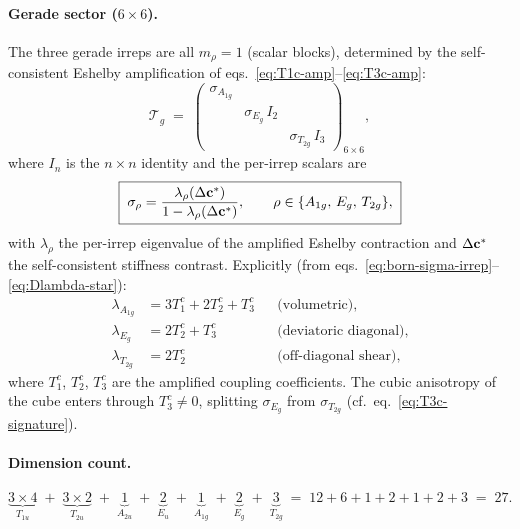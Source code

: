 \paragraph{Gerade sector ($6 \times 6$).}
The three gerade irreps are all $m_\rho = 1$ (scalar blocks),
determined by the self-consistent Eshelby amplification of
eqs.~\eqref{eq:T1c-amp}--\eqref{eq:T3c-amp}:
\begin{equation}
  \mathcal{T}_g
  \;=\;
  \begin{pmatrix}
    \sigma_{A_{1g}} & & \\[2pt]
    & \sigma_{E_g}\,I_2 & \\[2pt]
    & & \sigma_{T_{2g}}\,I_3
  \end{pmatrix}_{\!6\times 6},
  \label{eq:Tg-block}
\end{equation}
where $I_n$ is the $n \times n$ identity and the per-irrep
scalars are
\begin{equation}
  \boxed{\;\sigma_\rho
  = \frac{\lambda_\rho(\Delta\mathbf{c}^*)}
         {1 - \lambda_\rho(\Delta\mathbf{c}^*)},
  \qquad
  \rho \in \{A_{1g},\,E_g,\,T_{2g}\},\;}
  \label{eq:T-gerade}
\end{equation}
with $\lambda_\rho$ the per-irrep eigenvalue of the amplified
Eshelby contraction and $\Delta\mathbf{c}^*$ the self-consistent
stiffness contrast.  Explicitly (from
eqs.~\eqref{eq:born-sigma-irrep}--\eqref{eq:Dlambda-star}):
\begin{align}
  \lambda_{A_{1g}} &= 3T_1^c + 2T_2^c + T_3^c
    &&\text{(volumetric)}, \label{eq:lam-A1g}\\
  \lambda_{E_g}    &= 2T_2^c + T_3^c
    &&\text{(deviatoric diagonal)}, \label{eq:lam-Eg}\\
  \lambda_{T_{2g}} &= 2T_2^c
    &&\text{(off-diagonal shear)}, \label{eq:lam-T2g}
\end{align}
where $T_1^c$, $T_2^c$, $T_3^c$ are the amplified coupling
coefficients.  The cubic anisotropy of the cube enters through
$T_3^c \neq 0$, splitting $\sigma_{E_g}$ from $\sigma_{T_{2g}}$
(cf.\ eq.~\eqref{eq:T3c-signature}).

\paragraph{Dimension count.}
\begin{equation}
  \underbrace{3 \times 4}_{T_{1u}} \;+\;
  \underbrace{3 \times 2}_{T_{2u}} \;+\;
  \underbrace{1}_{A_{2u}} \;+\;
  \underbrace{2}_{E_u} \;+\;
  \underbrace{1}_{A_{1g}} \;+\;
  \underbrace{2}_{E_g} \;+\;
  \underbrace{3}_{T_{2g}}
  \;=\; 12 + 6 + 1 + 2 + 1 + 2 + 3
  \;=\; 27.
  \label{eq:dim-count}
\end{equation}

